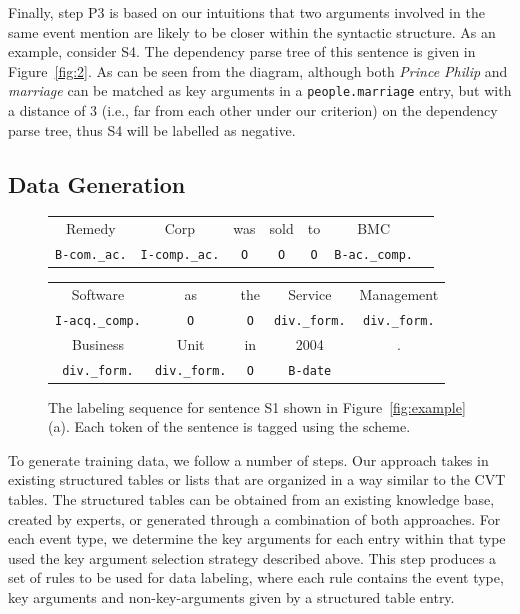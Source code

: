 Finally, step P3 is based on our intuitions that two arguments involved in the same event mention are likely to be closer within the
syntactic structure. As an example, consider S4. The dependency parse tree of this sentence is given in Figure~\ref{fig:2}. As can be seen
from the diagram, although both \emph{Prince Philip} and \emph{marriage} can be matched as key arguments in a  \texttt{people.marriage}
entry, but with a distance of 3 (i.e., far from each other under our criterion) on the dependency parse tree, thus S4 will be labelled as
negative.

\subsection{Data Generation}
\begin{figure}
\centering
\scriptsize
\begin{tabular}{ccccccc}
\toprule
Remedy & Corp & was & sold & to & BMC & \\
\rowcolor{Gray} \texttt{B-com.\_ac.} & \texttt{I-comp.\_ac.} & \texttt{O} & \texttt{O} & \texttt{O} & \texttt{B-ac.\_comp.} &\\
\end{tabular}
\begin{tabular}{ccccc}
Software & as & the & Service &Management \\
\rowcolor{Gray} \texttt{I-acq.\_comp.} & \texttt{O} & \texttt{O} & \texttt{div.\_form.} & \texttt{div.\_form.} \\
Business & Unit & in & 2004 &.\\
\rowcolor{Gray} \texttt{div.\_form.} & \texttt{div.\_form.} & \texttt{O} & \texttt{B-date} &\\
\bottomrule
\end{tabular}

\caption{The labeling sequence for sentence S1 shown in Figure~\ref{fig:example} (a). Each token of the sentence is tagged using the \BIO
scheme. \label{fig:ls}}

\end{figure}
To generate training data, we follow a number of steps. Our approach takes in existing structured tables or lists that are organized in a
way similar to the \FB CVT tables. The structured tables can be obtained from an existing knowledge base, created by experts, or generated
through a combination of both approaches. For each event type, we determine the key arguments for each entry within that type used the key
argument selection strategy described above. This step produces a set of rules to be used for data labeling, where each rule contains the
event type, key arguments and non-key-arguments given by a structured table entry.

